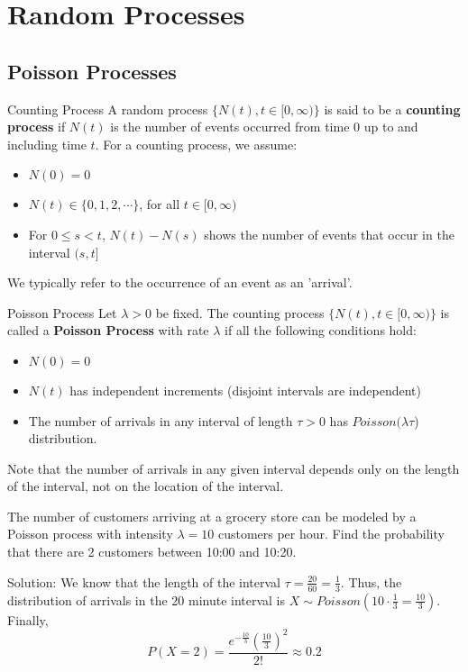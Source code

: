 \section{Random Processes}
\subsection{Poisson Processes}
\begin{defn}{Counting Process}{}
A random process \(\{N(t), t\in[0, \infty)\}\) is said to be a \textbf{counting process} if \(N(t)\) is the number of events occurred from time 0 up to and including time \(t\). For a counting process, we assume: 
\begin{itemize}
  \item \(N(0) = 0\)
  \item \(N(t) \in \{0, 1, 2, \cdots\}\), for all \(t \in [0, \infty)\)
  \item For \(0 \leq s < t\), \(N(t) - N(s)\) shows the number of events that occur in the interval \((s, t]\)
\end{itemize}
We typically refer to the occurrence of an event as an 'arrival'.
\end{defn}
\begin{defn}{Poisson Process}{}
Let \(\lambda > 0\) be fixed. The counting process \(\{N(t), t \in [0, \infty)\}\) is called a \textbf{Poisson Process} with rate \(\lambda\) if all the following conditions hold:
\begin{itemize}
  \item \(N(0) = 0\)
  \item \(N(t)\) has independent increments (disjoint intervals are independent)
  \item The number of arrivals in any interval of length \(\tau > 0\) has \(Poisson(\lambda \tau\)) distribution.
\end{itemize}
Note that the number of arrivals in any given interval depends only on the length of the interval, not on the location of the interval. 
\end{defn}
\begin{exmp}{}{}
The number of customers arriving at a grocery store can be modeled by a Poisson process with intensity \(\lambda = 10\) customers per hour. Find the probability that there are 2 customers between 10:00 and 10:20. \newline 

Solution: We know that the length of the interval \(\tau = \frac{20}{60} = \frac{1}{3}\). Thus, the distribution of arrivals in the 20 minute interval is \(X \sim Poisson(10 \cdot \frac{1}{3} = \frac{10}{3})\). Finally, 
\begin{equation*}
  P(X=2) = \frac{e^{-\frac{10}{3}}(\frac{10}{3})^2}{2!} \approx 0.2
\end{equation*}
\end{exmp}
